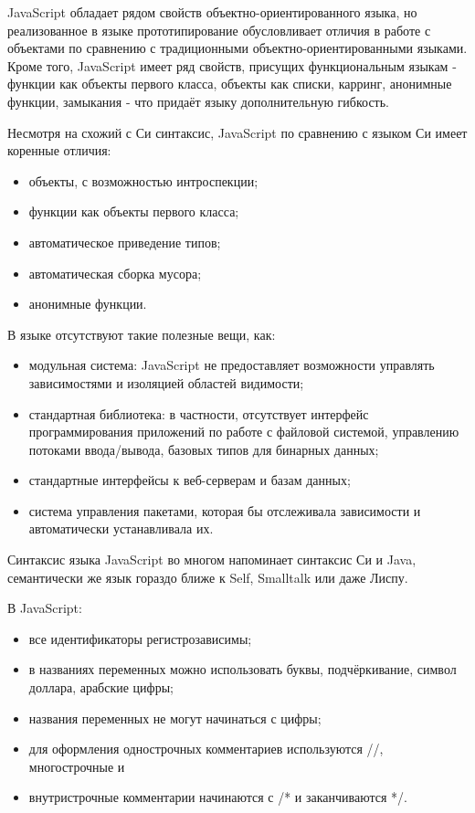 JavaScript обладает рядом свойств объектно-ориентированного языка, но реализованное в языке прототипирование обусловливает отличия в работе с объектами по сравнению с традиционными объектно-ориентированными языками. Кроме того, JavaScript имеет ряд свойств, присущих функциональным языкам - функции как объекты первого класса, объекты как списки, карринг, анонимные функции, замыкания - что придаёт языку дополнительную гибкость.

Несмотря на схожий с Си синтаксис, JavaScript по сравнению с языком Си имеет коренные отличия:

\begin{itemize}
  \item объекты, с возможностью интроспекции;
  \item функции как объекты первого класса;
  \item автоматическое приведение типов;
  \item автоматическая сборка мусора;
  \item анонимные функции.
\end{itemize}


В языке отсутствуют такие полезные вещи, как:

\begin{itemize}
  \item модульная система: JavaScript не предоставляет возможности управлять зависимостями и изоляцией областей видимости;
  \item стандартная библиотека: в частности, отсутствует интерфейс программирования приложений по работе с файловой системой, управлению потоками ввода/вывода, базовых типов для бинарных данных;
  \item стандартные интерфейсы к веб-серверам и базам данных;
  \item система управления пакетами, которая бы отслеживала зависимости и автоматически устанавливала их.
\end{itemize}

Синтаксис языка JavaScript во многом напоминает синтаксис Си и Java, семантически же язык гораздо ближе к Self, Smalltalk или даже Лиспу.

В JavaScript:

\begin{itemize}
  \item все идентификаторы регистрозависимы;
  \item в названиях переменных можно использовать буквы, подчёркивание, символ доллара, арабские цифры;
  \item названия переменных не могут начинаться с цифры;
  \item для оформления однострочных комментариев используются //, многострочные и \item внутристрочные комментарии начинаются с /* и заканчиваются */.
\end{itemize}


